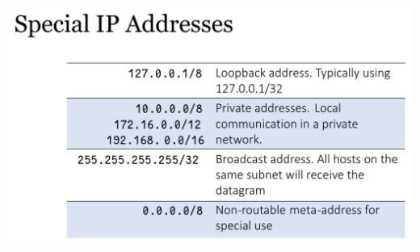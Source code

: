 \documentclass[a4paper]{article} \usepackage[backend=biber, style=numeric, sorting=none]{biblatex}
\begin{document}
\begin{multicols*}{4}
{\centering \includegraphics[scale=0.17]{special_ip_addresses}}

    \end{multicols*}
\end{document}
